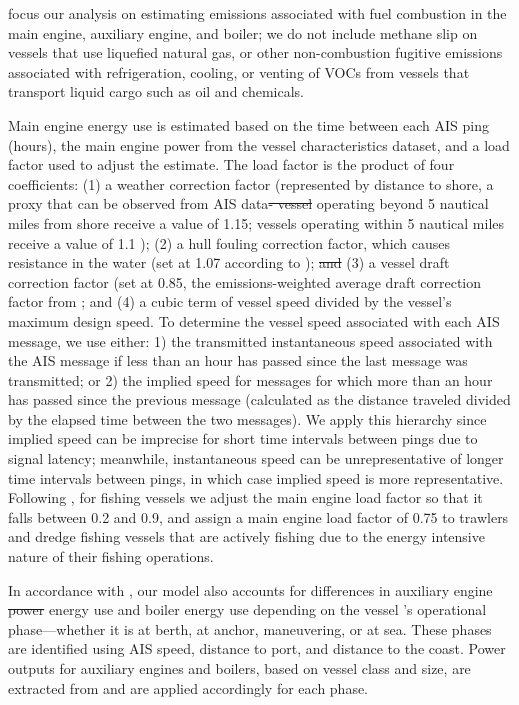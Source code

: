 \documentclass[lineno,pdflatex,sn-nature]{sn-jnl}
\makeatletter
\providecommand{\DIFadd}[1]{{\protect\color{blue}\uwave{#1}}} %
\providecommand{\DIFdel}[1]{{\protect\color{red}\sout{#1}}} %
\providecommand{\DIFaddbegin}{} %
\providecommand{\DIFaddend}{} %
\providecommand{\DIFdelbegin}{} %
\providecommand{\DIFdelend}{} %
\providecommand{\DIFscaledelfig}{0.5}
\newlength{\DIFdelgraphicswidth} %
\newlength{\DIFdelgraphicsheight} %
\providecommand{\DIFaddincludegraphics}[2][]{{\color{blue}\fbox{\DIFOincludegraphics[#1]{#2}}}} %
\providecommand{\DIFdelincludegraphics}[2][]{%
\sbox{\DIFdelgraphicsbox}{\DIFOincludegraphics[#1]{#2}}%
\settoboxwidth{\DIFdelgraphicswidth}{\DIFdelgraphicsbox} %
\settoboxtotalheight{\DIFdelgraphicsheight}{\DIFdelgraphicsbox} %
\scalebox{\DIFscaledelfig}{%
\parbox[b]{\DIFdelgraphicswidth}{\usebox{\DIFdelgraphicsbox}\\[-\baselineskip] \rule{\DIFdelgraphicswidth}{0em}}\llap{\resizebox{\DIFdelgraphicswidth}{\DIFdelgraphicsheight}{%
\setlength{\unitlength}{\DIFdelgraphicswidth}%
\begin{picture}(1,1)%
\thicklines\linethickness{2pt} %
{\color[rgb]{1,0,0}\put(0,0){\framebox(1,1){}}}%
{\color[rgb]{1,0,0}\put(0,0){\line( 1,1){1}}}%
{\color[rgb]{1,0,0}\put(0,1){\line(1,-1){1}}}%
\end{picture}%
}\hspace*{3pt}}} %
} %
\DeclareRobustCommand{\DIFaddbegin}{\DIFOaddbegin \let\includegraphics\DIFaddincludegraphics} %
\DeclareRobustCommand{\DIFaddend}{\DIFOaddend \let\includegraphics\DIFOincludegraphics} %
\DeclareRobustCommand{\DIFdelbegin}{\DIFOdelbegin \let\includegraphics\DIFdelincludegraphics} %
\DeclareRobustCommand{\DIFdelend}{\DIFOaddend \let\includegraphics\DIFOincludegraphics} %
\let\sout@orig\sout %
\renewcommand{\sout}[1]{\ifmmode\text{\sout@orig{\ensuremath{#1}}}\else\sout@orig{#1}\fi} %
\makeatother
\begin{document}
\DIFadd{We }\DIFaddend focus our analysis \DIFaddbegin \DIFadd{purely }\DIFaddend on estimating emissions associated with fuel combustion in the main engine, auxiliary engine, and boiler; we do not include  methane slip on vessels that use liquefied natural gas, or other non-combustion fugitive emissions associated with refrigeration, cooling, or venting of VOCs from vessels that transport liquid cargo such as oil and chemicals.

Main engine energy use is estimated based on the time between each AIS ping (hours), the main engine power from the vessel characteristics dataset, and a load factor used to adjust the estimate. The load factor is the product of four coefficients: (1) a weather correction factor (represented by distance to shore, a proxy that can be observed from AIS data\DIFdelbegin \DIFdel{- vessel }\DIFdelend \DIFaddbegin \DIFadd{; vessels }\DIFaddend operating beyond 5 nautical miles from shore receive a value of 1.15; vessels operating within 5 nautical miles receive a value of 1.1 \cite{fourth2020greenhouse}); (2) a hull fouling correction factor, which causes resistance in the water (set at 1.07 according to \cite{olmer2017greenhouse}); \DIFdelbegin \DIFdel{and }\DIFdelend (3) a vessel draft correction factor (set at 0.85, the emissions-weighted average draft correction factor from \cite{fourth2020greenhouse}\DIFaddbegin \DIFadd{)}\DIFaddend ; and (4) a cubic term of vessel speed divided by  the vessel's maximum design speed. To determine the vessel speed associated with each AIS message, we use either: 1) the transmitted instantaneous speed associated with the AIS message if less than an hour has passed since the last message was transmitted; or 2) the implied speed for messages for which more than an hour has passed since the previous message (calculated as the distance traveled divided by the elapsed time between the two messages). We apply this hierarchy since implied speed can be imprecise for short time intervals between pings due to signal latency; meanwhile, instantaneous speed can be unrepresentative of longer time intervals between pings, in which case implied speed is more representative. Following \cite{coello2015ais, sala2018economics}, for fishing vessels we adjust the main engine load factor so that it falls between 0.2 and 0.9, and assign a main engine load factor of 0.75 to trawlers and dredge fishing vessels that are actively fishing due to the energy intensive nature of their fishing operations. 

In accordance with \cite{fourth2020greenhouse}, our model also accounts for differences in auxiliary engine \DIFdelbegin \DIFdel{power }\DIFdelend energy use and boiler energy use depending on the vessel \DIFaddbegin \DIFadd{type, as well as the vessel}\DIFaddend ’s operational phase—whether it is at berth, at anchor, maneuvering, or at sea. These phases are identified using AIS speed, distance to port, and distance to the coast. Power outputs for auxiliary engines and boilers, based on vessel class and size, are extracted from \cite{fourth2020greenhouse} and are applied accordingly for each phase. 
\end{document}
